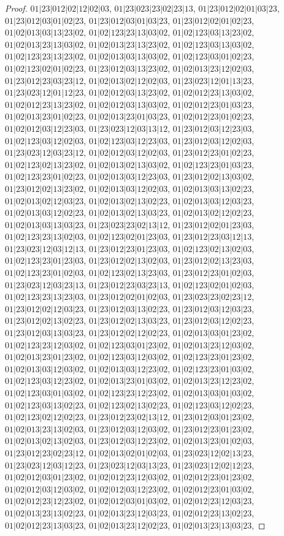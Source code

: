 \documentclass[12pt]{article}
\theoremstyle{plain}
\theoremstyle{definition}
\theoremstyle{remark}
\begin{document}
\begin{proof}
$01|23|012|02|12|02|03$, $01|23|023|23|02|23|13$, $01|23|012|02|01|03|23$, $01|23|012|03|01|02|23$, $01|23|012|03|01|03|23$, $01|23|012|02|01|02|23$, $01|02|013|03|13|23|02$, $01|02|123|23|13|03|02$, $01|02|123|03|13|23|02$, $01|02|013|23|13|03|02$, $01|02|013|23|13|23|02$, $01|02|123|03|13|03|02$, $01|02|123|23|13|23|02$, $01|02|013|03|13|03|02$, $01|02|123|03|01|02|23$, $01|02|123|02|01|02|23$, $01|23|012|03|13|23|02$, $01|02|013|23|12|02|03$, $01|23|012|23|03|23|12$, $01|02|013|02|12|02|03$, $01|23|023|12|01|13|23$, $01|23|023|12|01|12|23$, $01|02|012|03|13|23|02$, $01|02|012|23|13|03|02$, $01|02|012|23|13|23|02$, $01|02|012|03|13|03|02$, $01|02|012|23|01|03|23$, $01|02|013|23|01|02|23$, $01|02|013|23|01|03|23$, $01|02|012|23|01|02|23$, $01|02|012|03|12|23|03$, $01|23|023|12|03|13|12$, $01|23|012|03|12|23|03$, $01|02|123|03|12|02|03$, $01|02|123|03|12|23|03$, $01|23|012|03|12|02|03$, $01|23|023|12|03|23|12$, $01|02|012|03|12|02|03$, $01|23|012|23|01|02|23$, $01|02|123|02|13|23|02$, $01|02|013|02|13|03|02$, $01|02|123|23|01|03|23$, $01|02|123|23|01|02|23$, $01|02|013|03|12|23|03$, $01|23|012|02|13|03|02$, $01|23|012|02|13|23|02$, $01|02|013|03|12|02|03$, $01|02|013|03|13|02|23$, $01|02|013|02|12|03|23$, $01|02|013|02|13|02|23$, $01|02|013|03|12|03|23$, $01|02|013|03|12|02|23$, $01|02|013|02|13|03|23$, $01|02|013|02|12|02|23$, $01|02|013|03|13|03|23$, $01|23|023|23|02|13|12$, $01|23|012|02|01|23|03$, $01|02|123|23|13|02|03$, $01|02|123|02|01|23|03$, $01|23|012|23|03|12|13$, $01|23|023|12|03|12|13$, $01|23|012|23|01|23|03$, $01|02|123|02|13|02|03$, $01|02|123|23|01|23|03$, $01|23|012|02|13|02|03$, $01|23|012|02|13|23|03$, $01|02|123|23|01|02|03$, $01|02|123|02|13|23|03$, $01|23|012|23|01|02|03$, $01|23|023|12|03|23|13$, $01|23|012|23|03|23|13$, $01|02|123|02|01|02|03$, $01|02|123|23|13|23|03$, $01|23|012|02|01|02|03$, $01|23|023|23|02|23|12$, $01|23|012|02|12|03|23$, $01|23|012|03|13|02|23$, $01|23|012|03|12|03|23$, $01|23|012|02|13|02|23$, $01|23|012|02|13|03|23$, $01|23|012|03|12|02|23$, $01|23|012|03|13|03|23$, $01|23|012|02|12|02|23$, $01|02|013|03|01|23|02$, $01|02|123|23|12|03|02$, $01|02|123|03|01|23|02$, $01|02|013|23|12|03|02$, $01|02|013|23|01|23|02$, $01|02|123|03|12|03|02$, $01|02|123|23|01|23|02$, $01|02|013|03|12|03|02$, $01|02|013|03|12|23|02$, $01|02|123|23|01|03|02$, $01|02|123|03|12|23|02$, $01|02|013|23|01|03|02$, $01|02|013|23|12|23|02$, $01|02|123|03|01|03|02$, $01|02|123|23|12|23|02$, $01|02|013|03|01|03|02$, $01|02|123|03|13|02|23$, $01|02|123|02|13|02|23$, $01|02|123|03|12|02|23$, $01|02|123|02|12|02|23$, $01|23|012|23|02|13|12$, $01|23|012|03|01|23|02$, $01|02|013|23|13|02|03$, $01|23|012|03|12|03|02$, $01|23|012|23|01|23|02$, $01|02|013|02|13|02|03$, $01|23|012|03|12|23|02$, $01|02|013|23|01|02|03$, $01|23|012|23|02|23|12$, $01|02|013|02|01|02|03$, $01|23|023|12|02|13|23$, $01|23|023|12|03|12|23$, $01|23|023|12|03|13|23$, $01|23|023|12|02|12|23$, $01|02|012|03|01|23|02$, $01|02|012|23|12|03|02$, $01|02|012|23|01|23|02$, $01|02|012|03|12|03|02$, $01|02|012|03|12|23|02$, $01|02|012|23|01|03|02$, $01|02|012|23|12|23|02$, $01|02|012|03|01|03|02$, $01|02|012|23|12|03|23$, $01|02|013|23|13|02|23$, $01|02|013|23|12|03|23$, $01|02|012|23|13|02|23$, $01|02|012|23|13|03|23$, $01|02|013|23|12|02|23$, $01|02|013|23|13|03|23$, 
\end{proof}
\end{document}
